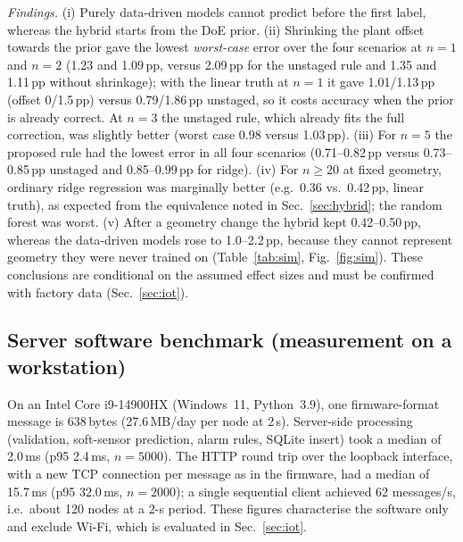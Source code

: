 \documentclass[journal]{IEEEtran}
\begin{document}
\emph{Findings.} (i) Purely data-driven models cannot predict before the first label, whereas the hybrid starts from the
DoE prior. (ii) Shrinking the plant offset towards the prior gave the lowest \emph{worst-case} error over the four
scenarios at $n=1$ and $n=2$ (1.23 and 1.09\,pp, versus 2.09\,pp for the unstaged rule and 1.35 and 1.11\,pp without
shrinkage); with the linear truth at $n=1$ it gave 1.01/1.13\,pp (offset 0/1.5\,pp) versus 0.79/1.86\,pp unstaged, so it
costs accuracy when the prior is already correct. At $n=3$ the unstaged rule, which already fits the full correction,
was slightly better (worst case 0.98 versus 1.03\,pp). (iii) For $n=5$ the proposed rule had the lowest error in all
four scenarios (0.71--0.82\,pp versus 0.73--0.85\,pp unstaged and 0.85--0.99\,pp for ridge). (iv) For $n\ge20$ at fixed geometry,
ordinary ridge regression was marginally better (e.g.\ 0.36 vs.\ 0.42\,pp, linear truth), as expected from the
equivalence noted in Sec.~\ref{sec:hybrid}; the random forest was worst. (v) After a geometry change the hybrid
kept 0.42--0.50\,pp, whereas the data-driven models rose to 1.0--2.2\,pp, because they cannot represent geometry they
were never trained on (Table~\ref{tab:sim}, Fig.~\ref{fig:sim}). These conclusions are conditional on the assumed
effect sizes and must be confirmed with factory data (Sec.~\ref{sec:iot}).

\subsection{Server software benchmark (measurement on a workstation)}
On an Intel Core i9-14900HX (Windows~11, Python~3.9), one firmware-format message is 638\,bytes
(27.6\,MB/day per node at 2\,s). Server-side processing (validation, soft-sensor prediction, alarm rules, SQLite insert)
took a median of 2.0\,ms (p95 2.4\,ms, $n=5000$). The HTTP round trip over the loopback interface, with a new TCP
connection per message as in the firmware, had a median of 15.7\,ms (p95 32.0\,ms, $n=2000$); a single sequential
client achieved 62 messages/s, i.e.\ about 120 nodes at a 2-s period. These figures characterise the software only and
exclude Wi-Fi, which is evaluated in Sec.~\ref{sec:iot}.
\end{document}
